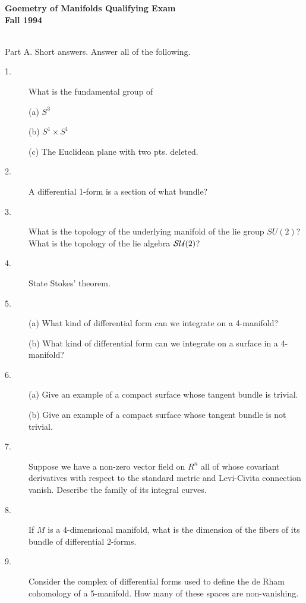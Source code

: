 \documentclass{article}
\begin{document}






\begin{center}\begin{LARGE}
{\bf Goemetry of Manifolds Qualifying Exam}\\ 
{\bf Fall 1994}\\ \end{LARGE}
\end{center}
\vspace{0.1in}
\noindent\hrulefill\\
Part A. Short answers. Answer all of the following.

\begin{description}
\item[1.]
What is the fundamental group of

\item[\quad] (a)
$S^3$

\item[\quad] (b)
$S^1 \times S^1$

\item[\quad] (c)
The Euclidean plane with two pts. deleted.

\item[2.]
A differential 1-form is a section of what bundle?

\item[3.]
What is the topology of the underlying manifold of the lie group
$SU(2)$? What is the topology of the lie algebra
$\begin{small}{\cal {SU}} \end{small} (2)$?

\item[4.]
State Stokes' theorem.

\item[5.] (a)
What kind of differential form can we integrate on a 4-manifold?

\item[\quad] (b)
What kind of differential form can we integrate on a surface in a 4-manifold?

\item[6.] (a)
Give an example of a compact surface whose tangent bundle is trivial.

\item[\quad] (b)
Give an example of a compact surface whose tangent bundle is not trivial.

\item[7.]
Suppose we have a non-zero vector field on $R^n$ all of whose covariant
derivatives with respect to the standard metric and Levi-Civita
connection vanish. Describe the family of its integral curves.

\item[8.]
If $M$ is a 4-dimensional manifold, what is the dimension of the fibers of
its bundle of differential 2-forms.

\item[9.]
Consider the complex of differential forms used to define the de Rham
cohomology of a 5-manifold. How many of these spaces are non-vanishing.

\end{description}
\end{document}
